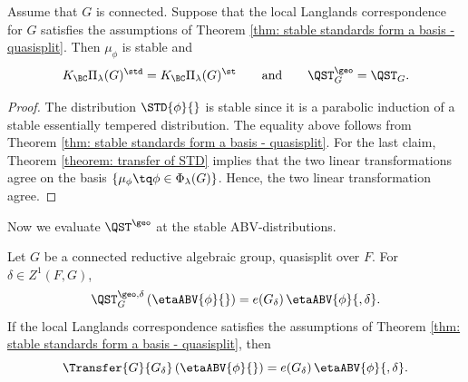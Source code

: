\documentclass[11pt,letterpaper]{amsart}
\numberwithin{equation}{section}
\begin{document}
\begin{lemma}\label{lemma: QST} Assume that $G$ is connected.
Suppose that the local Langlands correspondence for $G$ satisfies the assumptions of Theorem \ref{thm: stable standards form a basis - quasisplit}. 
Then $\mu_{\phi}$ is stable 
and 
\[ 
K_{\BC}\Pi_{\lambda}(G)^{\std} 
=
K_{\BC}\Pi_{\lambda}(G)^{\st}
\qquad\mathrm{and}\qquad
\QST^{\geo}_G = \QST_G.
\]
\end{lemma}

\begin{proof}
The distribution $\STD{\phi}{}$ is stable since it is a parabolic induction of a stable essentially tempered distribution. 
The equality above follows from Theorem \ref{thm: stable standards form a basis - quasisplit}. For the last claim,
Theorem \ref{theorem: transfer of STD} implies that the two linear transformations agree on the basis $\{\mu_{\phi}\tq\phi \in \Phi_{\lambda}(G)\}$. Hence, the two linear transformation agree.
\end{proof}



Now we evaluate $\QST^{\geo}$ at the stable ABV-distributions.

\begin{proposition}\label{prop: QST of ABV}
    Let $G$ be a connected reductive algebraic group, quasisplit over $F$. 
For $\delta\in Z^1(F,G)$,
\[
\QST_{G}^{\geo,\delta}
    \left( \etaABV{\phi}{} \right) 
    = 
    e(G_\delta)\,
    \etaABV{\phi}{,\delta}.
\]
If the local Langlands correspondence satisfies the assumptions of Theorem \ref{thm: stable standards form a basis - quasisplit}, then
    \[
    \Transfer{G}{G_\delta}
    \left( \etaABV{\phi}{} \right) 
    = 
    e(G_\delta)\,
    \etaABV{\phi}{,\delta}.
    \]
\end{proposition}
\end{document}
